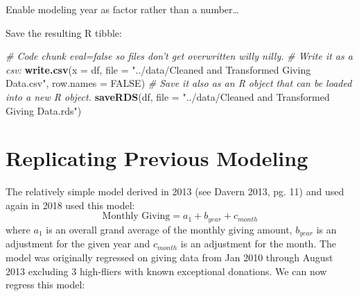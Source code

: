 \documentclass[]{article}
\newenvironment{Shaded}{\begin{snugshade}}{\end{snugshade}}
\newcommand{\CommentTok}[1]{\textcolor[rgb]{0.56,0.35,0.01}{\textit{#1}}}
\newcommand{\DataTypeTok}[1]{\textcolor[rgb]{0.13,0.29,0.53}{#1}}
\newcommand{\KeywordTok}[1]{\textcolor[rgb]{0.13,0.29,0.53}{\textbf{#1}}}
\newcommand{\NormalTok}[1]{#1}
\newcommand{\OperatorTok}[1]{\textcolor[rgb]{0.81,0.36,0.00}{\textbf{#1}}}
\newcommand{\OtherTok}[1]{\textcolor[rgb]{0.56,0.35,0.01}{#1}}
\newcommand{\StringTok}[1]{\textcolor[rgb]{0.31,0.60,0.02}{#1}}
\begin{document}
Enable modeling year as factor rather than a number\ldots{}

\begin{Shaded}
\end{Shaded}

Save the resulting R tibble:

\begin{Shaded}
\begin{Highlighting}[]
\CommentTok{# Code chunk eval=false so files don't get overwritten willy nilly.}
\CommentTok{# Write it as a csv:}
\KeywordTok{write.csv}\NormalTok{(}\DataTypeTok{x =}\NormalTok{ df,}
          \DataTypeTok{file =} \StringTok{"../data/Cleaned and Transformed Giving Data.csv"}\NormalTok{,}
          \DataTypeTok{row.names =} \OtherTok{FALSE}\NormalTok{)}
\CommentTok{# Save it also as an R object that can be loaded into a new R object.}
\KeywordTok{saveRDS}\NormalTok{(df, }\DataTypeTok{file =} \StringTok{"../data/Cleaned and Transformed Giving Data.rds"}\NormalTok{)}
\end{Highlighting}
\end{Shaded}

\newpage

\hypertarget{replicating-previous-modeling}{%
\section{Replicating Previous
Modeling}\label{replicating-previous-modeling}}

The relatively simple model derived in 2013 (see Davern 2013, pg. 11)
and used again in 2018 used this model:
\[\text{Monthly Giving} = a_1+b_{year}+c_{month}\] where \(a_1\) is an
overall grand average of the monthly giving amount, \(b_{year}\) is an
adjustment for the given year and \(c_{month}\) is an adjustment for the
month. The model was originally regressed on giving data from Jan 2010
through August 2013 excluding 3 high-fliers with known exceptional
donations. We can now regress this model:
\end{document}
